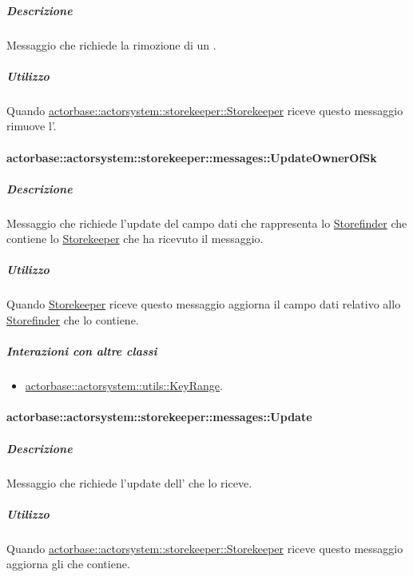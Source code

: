 \documentclass{scalatekids-article}
\begin{document}
\subparagraph{Descrizione}

Messaggio che richiede la rimozione di un .

\subparagraph{Utilizzo}

Quando \hyperref[sec:actorbase::actorsystem::storekeeper::Storekeeper]{actorbase::actorsystem::storekeeper::Storekeeper}
riceve questo messaggio rimuove l'.

\paragraph{actorbase::actorsystem::storekeeper::messages::UpdateOwnerOfSk}
\label{sec:actorbase::actorsystem::storekeeper::messages::UpdateOwnerOfSk}

\subparagraph{Descrizione}

Messaggio che richiede l'update del campo dati che rappresenta lo \hyperref[sec:actorbase::actorsystem::storefinder::Storefinder]{Storefinder} che contiene lo \hyperref[sec:actorbase::actorsystem::storekeeper::Storekeeper]{Storekeeper} che ha ricevuto il messaggio.

\subparagraph{Utilizzo}

Quando \hyperref[sec:actorbase::actorsystem::storekeeper::Storekeeper]{Storekeeper}
riceve questo messaggio aggiorna il campo dati relativo allo \hyperref[sec:actorbase::actorsystem::storefinder::Storefinder]{Storefinder} che lo contiene.

\subparagraph{Interazioni con altre classi}
\begin{itemize}
\item \hyperref[sec:actorbase::actorsystem::utils::KeyRange]{actorbase::actorsystem::utils::KeyRange}.
\end{itemize}

\paragraph{actorbase::actorsystem::storekeeper::messages::Update}
\label{sec:actorbase::actorsystem::storekeeper::messages::Update}

\subparagraph{Descrizione}

Messaggio che richiede l'update dell' che lo riceve.

\subparagraph{Utilizzo}

Quando \hyperref[sec:actorbase::actorsystem::storekeeper::Storekeeper]{actorbase::actorsystem::storekeeper::Storekeeper}
riceve questo messaggio aggiorna gli  che contiene.
\end{document}
